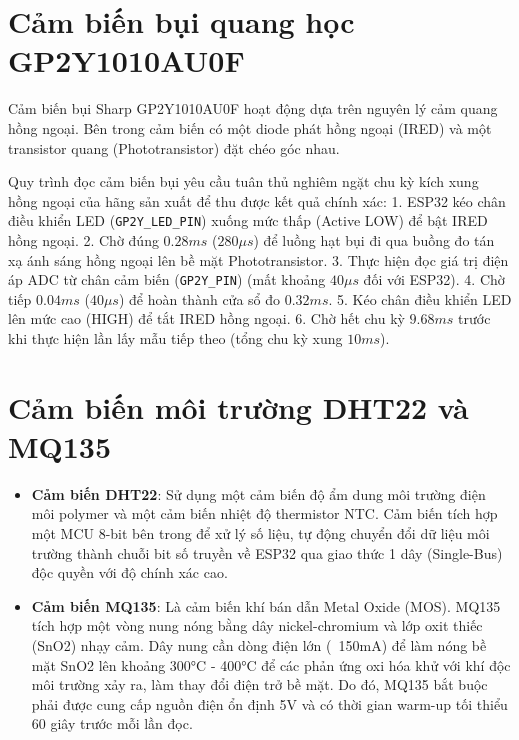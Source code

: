 \section{Cảm biến bụi quang học GP2Y1010AU0F}
Cảm biến bụi Sharp GP2Y1010AU0F hoạt động dựa trên nguyên lý cảm quang hồng ngoại. Bên trong cảm biến có một diode phát hồng ngoại (IRED) và một transistor quang (Phototransistor) đặt chéo góc nhau.

Quy trình đọc cảm biến bụi yêu cầu tuân thủ nghiêm ngặt chu kỳ kích xung hồng ngoại của hãng sản xuất để thu được kết quả chính xác:
1. ESP32 kéo chân điều khiển LED (\texttt{GP2Y\_LED\_PIN}) xuống mức thấp (Active LOW) để bật IRED hồng ngoại.
2. Chờ đúng \textbf{$0.28ms$} ($280\mu s$) để luồng hạt bụi đi qua buồng đo tán xạ ánh sáng hồng ngoại lên bề mặt Phototransistor.
3. Thực hiện đọc giá trị điện áp ADC từ chân cảm biến (\texttt{GP2Y\_PIN}) (mất khoảng $40\mu s$ đối với ESP32).
4. Chờ tiếp \textbf{$0.04ms$} ($40\mu s$) để hoàn thành cửa sổ đo $0.32ms$.
5. Kéo chân điều khiển LED lên mức cao (HIGH) để tắt IRED hồng ngoại.
6. Chờ hết chu kỳ \textbf{$9.68ms$} trước khi thực hiện lần lấy mẫu tiếp theo (tổng chu kỳ xung $10ms$).

\section{Cảm biến môi trường DHT22 và MQ135}
\begin{itemize}
    \item \textbf{Cảm biến DHT22}: Sử dụng một cảm biến độ ẩm dung môi trường điện môi polymer và một cảm biến nhiệt độ thermistor NTC. Cảm biến tích hợp một MCU 8-bit bên trong để xử lý số liệu, tự động chuyển đổi dữ liệu môi trường thành chuỗi bit số truyền về ESP32 qua giao thức 1 dây (Single-Bus) độc quyền với độ chính xác cao.
    \item \textbf{Cảm biến MQ135}: Là cảm biến khí bán dẫn Metal Oxide (MOS). MQ135 tích hợp một vòng nung nóng bằng dây nickel-chromium và lớp oxit thiếc (SnO2) nhạy cảm. Dây nung cần dòng điện lớn (~150mA) để làm nóng bề mặt SnO2 lên khoảng 300°C - 400°C để các phản ứng oxi hóa khử với khí độc môi trường xảy ra, làm thay đổi điện trở bề mặt. Do đó, MQ135 bắt buộc phải được cung cấp nguồn điện ổn định 5V và có thời gian warm-up tối thiểu 60 giây trước mỗi lần đọc.
\end{itemize}

